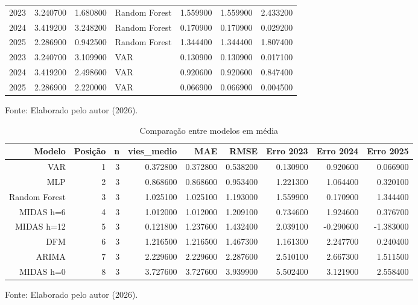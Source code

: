 \begin{table}[htbp]
\begin{tabularx}{\textwidth}{rrr>{\RaggedRight\arraybackslash}Xrrr}
		2023 & 3.240700 & 1.680800 & Random Forest & 1.559900 & 1.559900 & 2.433200 \\
		2024 & 3.419200 & 3.248200 & Random Forest & 0.170900 & 0.170900 & 0.029200 \\
		2025 & 2.286900 & 0.942500 & Random Forest & 1.344400 & 1.344400 & 1.807400 \\
		2023 & 3.240700 & 3.109900 & VAR & 0.130900 & 0.130900 & 0.017100 \\
		2024 & 3.419200 & 2.498600 & VAR & 0.920600 & 0.920600 & 0.847400 \\
		2025 & 2.286900 & 2.220000 & VAR & 0.066900 & 0.066900 & 0.004500 \\
		\bottomrule
	\end{tabularx}
	
	
	\vspace{0.1cm}
	
	\small Fonte: Elaborado pelo autor (2026).
\end{table}


\begin{table}[htbp]
	\centering
	\captionsetup{justification=centering}
	\caption{Comparação entre modelos em média}
	\label{tab:comparacao_modelos_final}
	
	\scriptsize
	\setlength{\tabcolsep}{2pt}
	\renewcommand{\arraystretch}{1.3}
	
	\begin{tabular}{rrrrrrrrr}
		\toprule
		Modelo & Posição & n & vies\_medio & MAE & RMSE & Erro 2023 & Erro 2024 & Erro 2025 \\
		\midrule
		VAR & 1 & 3 & 0.372800 & 0.372800 & 0.538200 & 0.130900 & 0.920600 & 0.066900 \\
		MLP & 2 & 3 & 0.868600 & 0.868600 & 0.953400 & 1.221300 & 1.064400 & 0.320100 \\
		Random Forest & 3 & 3 & 1.025100 & 1.025100 & 1.193000 & 1.559900 & 0.170900 & 1.344400 \\
		MIDAS h=6 & 4 & 3 & 1.012000 & 1.012000 & 1.209100 & 0.734600 & 1.924600 & 0.376700 \\
		MIDAS h=12 & 5 & 3 & 0.121800 & 1.237600 & 1.432400 & 2.039100 & -0.290600 & -1.383000 \\
		DFM & 6 & 3 & 1.216500 & 1.216500 & 1.467300 & 1.161300 & 2.247700 & 0.240400 \\
		ARIMA & 7 & 3 & 2.229600 & 2.229600 & 2.287600 & 2.510100 & 2.667300 & 1.511500 \\
		MIDAS h=0 & 8 & 3 & 3.727600 & 3.727600 & 3.939900 & 5.502400 & 3.121900 & 2.558400 \\
		\bottomrule
	\end{tabular}
	
	
	\vspace{0.1cm}
	
	\small Fonte: Elaborado pelo autor (2026).
\end{table}


